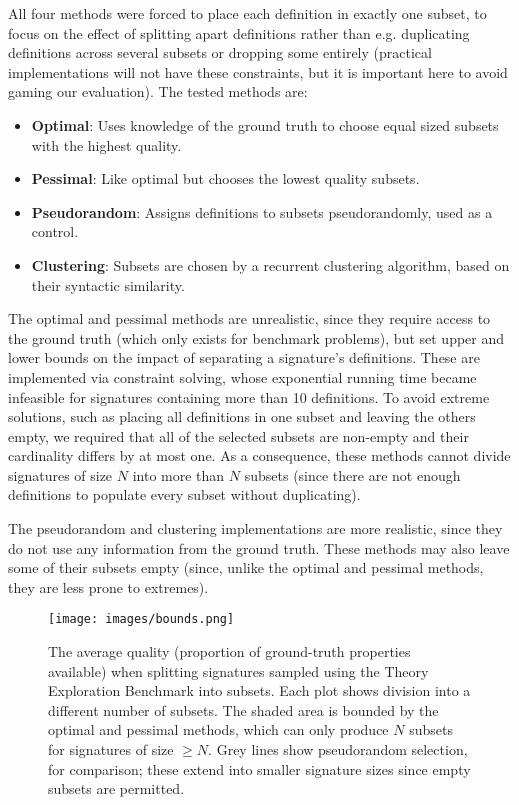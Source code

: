 All four methods were forced to place each definition in exactly one subset, to
focus on the effect of splitting apart definitions rather than e.g. duplicating
definitions across several subsets or dropping some entirely (practical
implementations will not have these constraints, but it is important here to
avoid gaming our evaluation). The tested methods are:

\begin{itemize}
\item \textbf{Optimal}: Uses knowledge of the ground truth to choose equal sized
  subsets with the highest quality.
\item \textbf{Pessimal}: Like optimal but chooses the lowest quality subsets.
\item \textbf{Pseudorandom}: Assigns definitions to subsets pseudorandomly, used
  as a control.
\item \textbf{Clustering}: Subsets are chosen by a recurrent clustering
  algorithm, based on their syntactic similarity.
\end{itemize}

The optimal and pessimal methods are unrealistic, since they require access to
the ground truth (which only exists for benchmark problems), but set upper and
lower bounds on the impact of separating a signature's definitions. These are
implemented via constraint solving, whose exponential running time became
infeasible for signatures containing more than 10 definitions. To avoid extreme
solutions, such as placing all definitions in one subset and leaving the others
empty, we required that all of the selected subsets are non-empty and their
cardinality differs by at most one. As a consequence, these methods cannot
divide signatures of size $N$ into more than $N$ subsets (since there are not
enough definitions to populate every subset without duplicating).

The pseudorandom and clustering implementations are more realistic, since they
do not use any information from the ground truth. These methods may also leave
some of their subsets empty (since, unlike the optimal and pessimal methods,
they are less prone to extremes).

\begin{figure}
  \texttt{[image: images/bounds.png]}
  \caption{The average quality (proportion of ground-truth properties available)
    when splitting signatures sampled using the Theory Exploration Benchmark
    into subsets. Each plot shows division into a different number of subsets.
    The shaded area is bounded by the optimal and pessimal methods, which can
    only produce $N$ subsets for signatures of size $\geq N$. Grey lines show
    pseudorandom selection, for comparison; these extend into smaller signature
    sizes since empty subsets are permitted.}
  \label{fig:bounds}
\end{figure}

